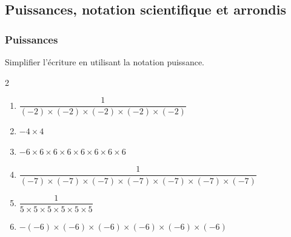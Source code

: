 {\subsection*{Puissances, notation scientifique et arrondis}
\subsubsection*{Puissances}

\begin{Exercice}
Simplifier l'écriture en utilisant la notation puissance.
\vspace{-0.5cm}
\begin{multicols}{2}
\begin{enumerate}[itemsep=1em]
	\item \begin{minipage}[t]{\linewidth}$ \dfrac{1}{(-2)\times(-2)\times(-2)\times(-2)\times(-2)}$\end{minipage}
	\item \begin{minipage}[t]{\linewidth}$- 4\times4$\end{minipage}
	\item \begin{minipage}[t]{\linewidth}$- 6\times6\times6\times6\times6\times6\times6\times6$\end{minipage}
	\item \begin{minipage}[t]{\linewidth}{\small $ \dfrac{1}{(-7)\times(-7)\times(-7)\times(-7)\times(-7)\times(-7)\times(-7)}$}\end{minipage}
	\item \begin{minipage}[t]{\linewidth}$ \dfrac{1}{5\times5\times5\times5\times5\times5}$\end{minipage}
	\item \begin{minipage}[t]{\linewidth}$- (-6)\times(-6)\times(-6)\times(-6)\times(-6)\times(-6)$\end{minipage}
\end{enumerate}
\end{multicols}
\vspace{-0.5cm}
\end{Exercice}
\newpage
\begin{Exercice}

\end{Exercice}}
